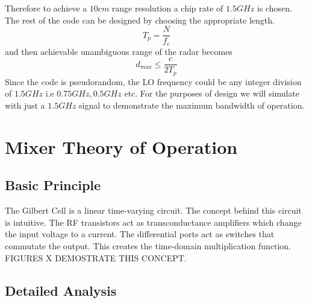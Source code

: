 \documentclass{article}                                                         %
\begin{document}
Therefore to achieve a $10cm$ range resolution a chip rate of $1.5 GHz$ is chosen. The rest of the code can be designed by
choosing the appropriate length. \\
\begin{equation}
  \label{eq:codelength}
  T_{p} = \dfrac{N}{f_c}
\end{equation}
and then achievable unambiguous range of the radar becomes
\begin{equation}
  \label{eq:maxrange}
  d_{max} \leq \dfrac{c}{2T_p}
\end{equation}
Since the code is pseudorandom, the LO frequency could be any integer division of $1.5GHz$ i.e $0.75GHz, 0.5GHz$ etc.
For the purposes of design we will simulate with just a $1.5GHz$ signal to demonstrate the maximum bandwidth of operation.
\newpage
\section{Mixer Theory of Operation}
\subsection{Basic Principle}

The Gilbert Cell is a linear time-varying circuit. The concept behind this circuit is intuitive. The RF transistors act as
transconductance amplifiers which change the input voltage to a current. The differential ports act as switches that commutate the output.
This creates the time-domain multiplication function. FIGURES X DEMOSTRATE THIS CONCEPT.

\subsection{Detailed Analysis}
\end{document}
